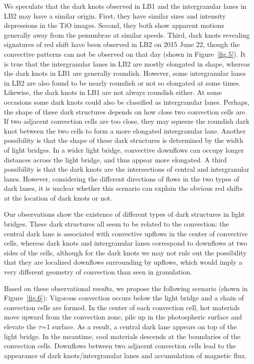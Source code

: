 \documentclass[preprint2]{aastex}
\begin{document}
We speculate that the dark knots observed in LB1 and the intergranular lanes in LB2 may have a similar origin. First, they have similar sizes and intensity depressions in the TiO images. Second, they both show apparent motions generally away from the penumbrae at similar speeds. Third, dark knots revealing signatures of red shift have been observed in LB2 on 2015 June 22, though the convective patterns can not be observed on that day (shown in Figure~\ref{fig.5}). It is true that the intergranular lanes in LB2 are mostly elongated in shape, whereas the dark knots in LB1 are generally roundish. However, some intergranular lanes in LB2 are also found to be nearly roundish or not so elongated at some times. Likewise, the dark knots in LB1 are not always roundish either. At some occasions some dark knots could also be classified as intergranular lanes. Perhaps, the shape of these dark structures depends on how close two convection cells are. If two adjacent convection cells are too close, they may squeeze the roundish dark knot between the two cells to form a more elongated intergranular lane. Another possibility is that the shape of these dark structures is determined by the width of light bridges. In a wider light bridge, convective downflows can occupy longer distances across the light bridge, and thus appear more elongated. A third possibility is that the dark knots are the intersections of central and intergranular lanes. However, considering the different directions of flows in the two types of dark lanes, it is unclear whether this scenario can explain the obvious red shifts at the location of dark knots or not. 

Our observations show the existence of different types of dark structures in light bridges. These dark structures all seem to be related to the convection: the central dark lane is associated with convective upflows in the center of convective cells, whereas dark knots and intergranular lanes correspond to downflows at two sides of the cells, although for the dark knots we may not rule out the possibility that they are localized downflows surrounding by upflows, which would imply a very different geometry of convection than seen in granulation.

Based on these observational results, we propose the following scenario (shown in Figure~\ref{fig.6}): Vigorous convection occurs below the light bridge and a chain of convection cells are formed. In the center of each convection cell, hot materials move upward from the convection zone, pile up in the photospheric surface and elevate the $\tau$=1 surface. As a result, a central dark lane appears on top of the light bridge. In the meantime, cool materials descends at the boundaries of the convection cells. Downflows between two adjacent convection cells lead to the appearance of dark knots/intergranular lanes and accumulation of magnetic flux.
\end{document}
